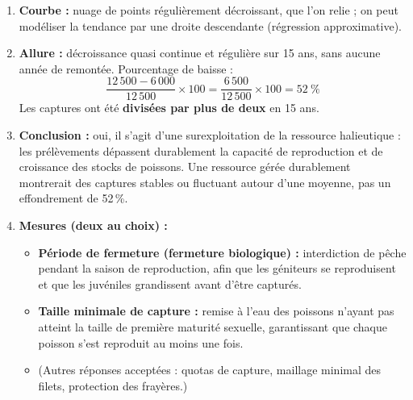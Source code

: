 \documentclass[11pt]{article}
\newcommand{\cle}[1]{{\popxbold\color{popdark}#1}}
\begin{document}
\begin{corrige}
\begin{enumerate}
\item \textbf{Courbe :} nuage de points régulièrement décroissant, que l'on relie ; on peut modéliser la tendance par une droite descendante (régression approximative).
\item \textbf{Allure :} décroissance quasi continue et régulière sur 15 ans, sans aucune année de remontée. Pourcentage de baisse :
\[ \dfrac{12\,500 - 6\,000}{12\,500} \times 100 = \dfrac{6\,500}{12\,500} \times 100 = \SI{52}{\%} \]
Les captures ont été \textbf{divisées par plus de deux} en 15 ans.
\item \textbf{Conclusion :} oui, il s'agit d'une \cle{surexploitation} de la ressource halieutique : les prélèvements dépassent durablement la capacité de reproduction et de croissance des stocks de poissons. Une ressource gérée durablement montrerait des captures stables ou fluctuant autour d'une moyenne, pas un effondrement de 52\,\%.
\item \textbf{Mesures (deux au choix) :}
\begin{itemize}
\item \textbf{Période de fermeture (fermeture biologique) :} interdiction de pêche pendant la saison de reproduction, afin que les géniteurs se reproduisent et que les juvéniles grandissent avant d'être capturés.
\item \textbf{Taille minimale de capture :} remise à l'eau des poissons n'ayant pas atteint la taille de première maturité sexuelle, garantissant que chaque poisson s'est reproduit au moins une fois.
\item (Autres réponses acceptées : quotas de capture, maillage minimal des filets, protection des frayères.)
\end{itemize}
\end{enumerate}
\end{corrige}
\end{document}
